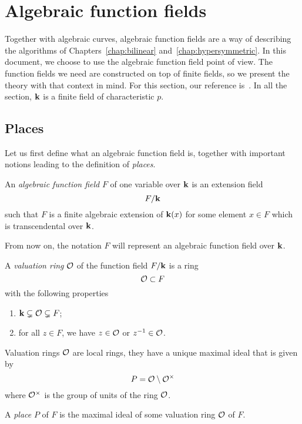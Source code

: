 \section{Algebraic function fields}
\label{sec:algebraic-function-fields}

%

Together with algebraic curves, algebraic function fields are a way of
describing the algorithms of Chapters~\ref{chap:bilinear}
and~\ref{chap:hypersymmetric}. In this document, we choose to use the algebraic
function field point of view. The function fields we need are constructed
on top of finite fields, so we present the theory with that context in mind. For
this section, our reference is~\cite{Stichtenoth09}. In all the section, $\mathbf{k}$ is
a finite field of characteristic $p$.

\subsection{Places}

Let us first define what an algebraic function field is, together with important
notions leading to the definition of \emph{places}.
\begin{defi}
  An \emph{algebraic function field} $F$ of one variable over $\mathbf{k}$ is an
  extension field 
  \[
    F/\mathbf{k}
  \]
  such that $F$ is a finite algebraic extension of
  $\mathbf{k}(x)$ for some element $x\in F$ which is transcendental over $\mathbf{k}$.
\end{defi}
From now on, the notation $F$ will represent an algebraic function field over
$\mathbf{k}$.
\begin{defi}
  A \emph{valuation ring} $\mathcal{O}$ of the function field $F/\mathbf{k}$ is a ring 
  \[
    \mathcal{O} \subset F
  \]
  with the following properties
  \begin{enumerate}
    \item $\mathbf{k}\subsetneq\mathcal{O}\subsetneq F$;
    \item for all $z\in F$, we have $z\in\mathcal{O}$ or $z^{-1}\in\mathcal{O}$.
  \end{enumerate}
\end{defi}
Valuation rings $\mathcal{O}$ are local rings, \ie they have a unique maximal ideal that is
given by 
\[
  P = \mathcal{O}\setminus\mathcal{O}^\times
\]
where $\mathcal{O}^\times$ is the group of units of the ring $\mathcal{O}$.
\begin{defi}[Place]
  A \emph{place} $P$ of $F$ is the maximal ideal of some valuation ring $\mathcal{O}$ of $F$.
\end{defi}

